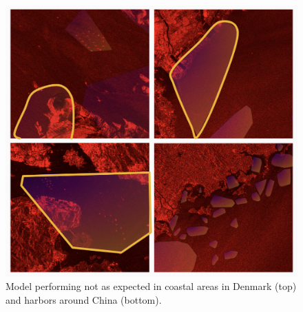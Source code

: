 \begin{figure}[ht]
\begin{center}
\centerline{\includegraphics[width=\columnwidth]{images/bad-results.png}}
\caption{Model performing not as expected in coastal areas in Denmark (top) and harbors around China (bottom).}
\label{bad-results}
\end{center}
\end{figure}